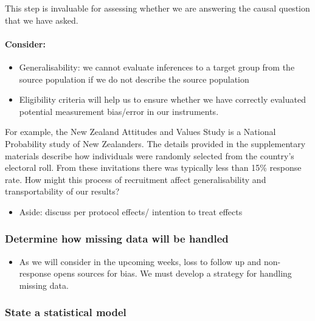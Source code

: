 \documentclass[
  singlecolumn]{article}
\let\oldparagraph\paragraph
\renewcommand{\paragraph}[1]{\oldparagraph{#1}\mbox{}}
\providecommand{\tightlist}{%
  \setlength{\itemsep}{0pt}\setlength{\parskip}{0pt}}\usepackage{longtable,booktabs,array}
\begin{document}
This step is invaluable for assessing whether we are answering the
causal question that we have asked.

\hypertarget{consider-1}{%
\paragraph{Consider:}\label{consider-1}}

\begin{itemize}
\tightlist
\item
  Generalisability: we cannot evaluate inferences to a target group from
  the source population if we do not describe the source population
\item
  Eligibility criteria will help us to ensure whether we have correctly
  evaluated potential measurement bias/error in our instruments.
\end{itemize}

For example, the New Zealand Attitudes and Values Study is a National
Probability study of New Zealanders. The details provided in the
supplementary materials describe how individuals were randomly selected
from the country's electoral roll. From these invitations there was
typically less than 15\% response rate. How might this process of
recruitment affect generalisability and transportability of our results?

\begin{itemize}
\tightlist
\item
  Aside: discuss per protocol effects/ intention to treat effects
\end{itemize}

\hypertarget{determine-how-missing-data-will-be-handled}{%
\subsubsection{Determine how missing data will be
handled}\label{determine-how-missing-data-will-be-handled}}

\begin{itemize}
\tightlist
\item
  As we will consider in the upcoming weeks, loss to follow up and
  non-response opens sources for bias. We must develop a strategy for
  handling missing data.
\end{itemize}

\hypertarget{state-a-statistical-model}{%
\subsubsection{State a statistical
model}\label{state-a-statistical-model}}
\end{document}

